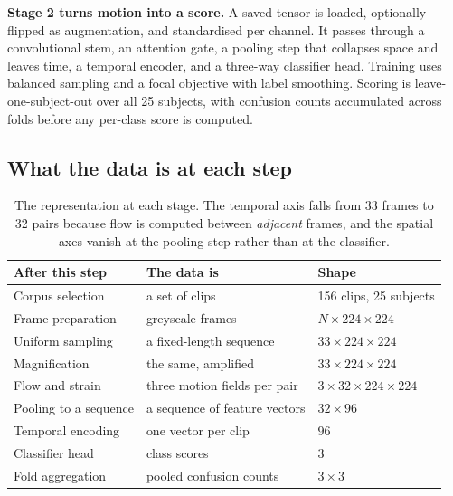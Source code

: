 \textbf{Stage 2 turns motion into a score.} A saved tensor is loaded,
optionally flipped as augmentation, and standardised per channel. It passes
through a convolutional stem, an attention gate, a pooling step that collapses
space and leaves time, a temporal encoder, and a three-way classifier head.
Training uses balanced sampling and a focal objective with label smoothing.
Scoring is leave-one-subject-out over all 25 subjects, with confusion counts
accumulated across folds before any per-class score is computed.

\subsection{What the data is at each step}
\label{sec:pipeline-shapes-discussion}

\begin{table}[htbp]
	\centering
	\small
	\begin{tabular}{@{}lll@{}}
		\hline
		\textbf{After this step} & \textbf{The data is} & \textbf{Shape} \\
		\hline
		Corpus selection      & a set of clips                & 156 clips, 25 subjects \\
		Frame preparation     & greyscale frames              & $N \times 224 \times 224$ \\
		Uniform sampling      & a fixed-length sequence       & $33 \times 224 \times 224$ \\
		Magnification         & the same, amplified           & $33 \times 224 \times 224$ \\
		Flow and strain       & three motion fields per pair  & $3 \times 32 \times 224 \times 224$ \\
		Pooling to a sequence & a sequence of feature vectors & $32 \times 96$ \\
		Temporal encoding     & one vector per clip           & $96$ \\
		Classifier head       & class scores                  & $3$ \\
		Fold aggregation      & pooled confusion counts       & $3 \times 3$ \\
		\hline
	\end{tabular}
	\caption[What the data is at each pipeline step]{The representation at each
	stage. The temporal axis falls from 33 frames to 32 pairs because flow is
	computed between \emph{adjacent} frames, and the spatial axes vanish at the
	pooling step rather than at the classifier.}
	\label{tab:pipeline-shapes}
\end{table}

